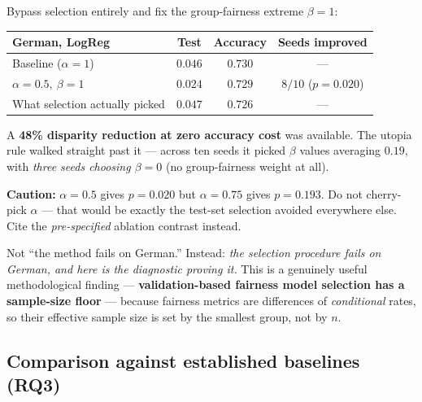 \begin{example}
Bypass selection entirely and fix the group-fairness extreme $\beta = 1$:
\begin{center}
\begin{tabular}{@{}lccc@{}}
\toprule
German, LogReg & Test \dpdtwo{} & Accuracy & Seeds improved \\
\midrule
Baseline ($\alpha{=}1$) & $0.046$ & $0.730$ & --- \\
$\alpha{=}0.5,\ \beta{=}1$ & $\mathbf{0.024}$ & $\mathbf{0.729}$ & $8/10$ ($p=0.020$) \\
\midrule
What selection actually picked & $0.047$ & $0.726$ & --- \\
\bottomrule
\end{tabular}
\end{center}
A \textbf{48\% disparity reduction at zero accuracy cost} was available. The
utopia rule walked straight past it --- across ten seeds it picked
$\beta$ values averaging $0.19$, with \emph{three seeds choosing $\beta = 0$}
(no group-fairness weight at all).

\medskip
\textbf{Caution:} $\alpha=0.5$ gives $p=0.020$ but $\alpha=0.75$ gives
$p=0.193$. Do not cherry-pick $\alpha$ --- that would be exactly the test-set
selection avoided everywhere else. Cite the \emph{pre-specified} ablation
contrast instead.
\end{example}

\begin{keybox}
Not ``the method fails on German.'' Instead: \emph{the selection procedure fails
on German, and here is the diagnostic proving it.} This is a genuinely useful
methodological finding --- \textbf{validation-based fairness model selection has
a sample-size floor} --- because fairness metrics are differences of
\emph{conditional} rates, so their effective sample size is set by the smallest
group, not by $n$.
\end{keybox}

\subsection{Comparison against established baselines (RQ3)}

